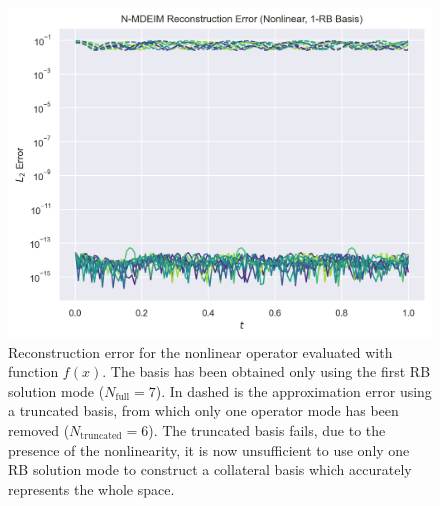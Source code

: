 \documentclass[../../thesis.tex]{subfiles}
\begin{document}
\begin{figure}[h]
    \includegraphics[width=\columnwidth]{research_project/piston/figures/svd_fourier/trilinear_nonlinear/rb_basis_mdeim_errors_nonlinear_num_1.png}
    \caption{Reconstruction error for the nonlinear operator evaluated with function $f(x)$.
    The basis has been obtained only using the first RB solution mode ($N_{\text{full}}=7$).
    In dashed is the approximation error using a truncated basis, 
    from which only one operator mode has been removed ($N_{\text{truncated}}=6$). 
    The truncated basis fails, due to the presence of the nonlinearity, 
    it is now unsufficient to use only one RB solution mode 
    to construct a collateral basis which accurately represents the whole space.}
    \label{fig:appendix_rb_nonlinear_num_1}
\end{figure}
\end{document}

